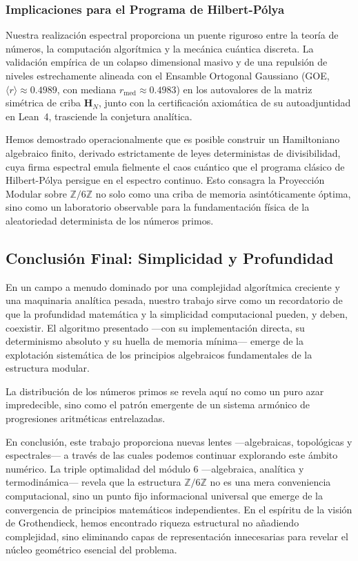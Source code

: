 \documentclass{article}
\numberwithin{equation}{section}
\theoremstyle{plain}
\theoremstyle{definition}
\begin{document}
\subsubsection{Implicaciones para el Programa de Hilbert-Pólya}

Nuestra realización espectral proporciona un puente riguroso entre la teoría de números, la computación algorítmica y la mecánica cuántica discreta. La validación empírica de un colapso dimensional masivo y de una repulsión de niveles estrechamente alineada con el Ensamble Ortogonal Gaussiano (GOE, $\langle r \rangle \approx 0.4989$, con mediana $r_{\text{med}} \approx 0.4983$) en los autovalores de la matriz simétrica de criba $\mathbf{H}_N$, junto con la certificación axiomática de su autoadjuntidad en Lean~4, trasciende la conjetura analítica.

Hemos demostrado operacionalmente que es posible construir un Hamiltoniano algebraico finito, derivado estrictamente de leyes deterministas de divisibilidad, cuya firma espectral emula fielmente el caos cuántico que el programa clásico de Hilbert-Pólya persigue en el espectro continuo. Esto consagra la Proyección Modular sobre $\mathbb{Z}/6\mathbb{Z}$ no solo como una criba de memoria asintóticamente óptima, sino como un laboratorio observable para la fundamentación física de la aleatoriedad determinista de los números primos.

\subsection{Conclusión Final: Simplicidad y Profundidad}

En un campo a menudo dominado por una complejidad algorítmica creciente y una maquinaria analítica pesada, nuestro trabajo sirve como un recordatorio de que la profundidad matemática y la simplicidad computacional pueden, y deben, coexistir. El algoritmo presentado —con su implementación directa, su determinismo absoluto y su huella de memoria mínima— emerge de la explotación sistemática de los principios algebraicos fundamentales de la estructura modular.

La distribución de los números primos se revela aquí no como un puro azar impredecible, sino como el patrón emergente de un sistema armónico de progresiones aritméticas entrelazadas.

En conclusión, este trabajo proporciona nuevas lentes —algebraicas, topológicas y espectrales— a través de las cuales podemos continuar explorando este ámbito numérico. La triple optimalidad del módulo 6 —algebraica, analítica y termodinámica— revela que la estructura $\mathbb{Z}/6\mathbb{Z}$ no es una mera conveniencia computacional, sino un punto fijo informacional universal que emerge de la convergencia de principios matemáticos independientes. En el espíritu de la visión de Grothendieck, hemos encontrado riqueza estructural no añadiendo complejidad, sino eliminando capas de representación innecesarias para revelar el núcleo geométrico esencial del problema.
\end{document}

